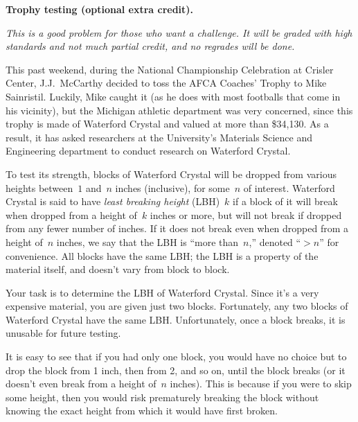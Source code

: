 \documentclass[11pt,addpoints,answers]{exam}
\begin{document}
\begin{questions}
\begin{parts}
    \begin{solution} \end{solution}
  \end{parts}

\ifprintanswers
\else
\newpage
\fi
    
  \bonusquestion[5] \textbf{Trophy testing (optional extra credit).} 
  
  \emph{This is a good problem for those who want a challenge.
   It will be graded with high standards and not much partial credit, and no regrades will be done.}
  
  This past weekend, during the National Championship Celebration at Crisler Center, J.J.\ McCarthy decided to toss the AFCA Coaches' Trophy to Mike Sainristil.
  Luckily, Mike caught it (as he does with most footballs that come in his vicinity), but the Michigan athletic department was very concerned, since this trophy is made of Waterford Crystal and valued at more than \$34,130.
  As a result, it has asked researchers at the University's Materials Science and Engineering department to conduct research on Waterford Crystal.
 
  To test its strength, blocks of Waterford Crystal will be dropped from various heights between~$1$ and~$n$ inches (inclusive), for some~$n$ of interest.
  Waterford Crystal is said to have \emph{least breaking height} (LBH)~$k$ if a block of it will break when dropped from a height of~$k$ inches or more, but will not break if dropped from any fewer number of inches.
  If it does not break even when dropped from a height of~$n$ inches, we say that the LBH is ``more than~$n$,'' denoted ``$>n$'' for convenience.
  All blocks have the same LBH; the LBH is a property of the material itself, and doesn't vary from block to block.

  Your task is to determine the LBH of Waterford Crystal.
  Since it's a very expensive material, you are given just two blocks.
  Fortunately, any two blocks of Waterford Crystal have the same LBH\@.
  Unfortunately, once a block breaks, it is unusable for future testing.
 
  It is easy to see that if you had only one block, you would have no choice but to drop the block from 1 inch, then from 2, and so on, until the block breaks (or it doesn't even break from a height of~$n$ inches).
  This is because if you were to skip some height, then you would risk prematurely breaking the block without knowing the exact height from which it would have first broken.


\end{questions}
\end{document}
